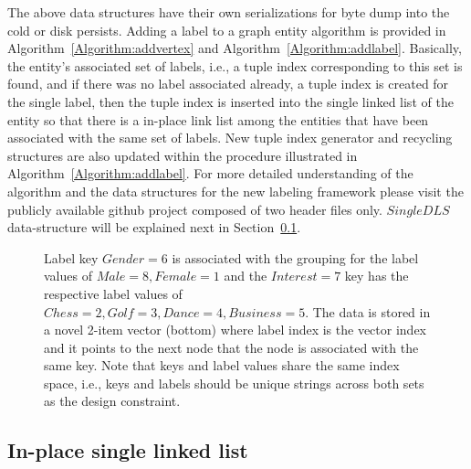 \documentclass[preprint,3p,twocolumn]{elsarticle}
\begin{document}
The above data structures have their own serializations for byte dump into the cold or disk persists. Adding a label to a graph entity algorithm is provided in Algorithm~\ref{Algorithm:addvertex} and Algorithm~\ref{Algorithm:addlabel}. Basically, the entity's associated set of labels, i.e., a tuple index corresponding to this set is found, and if there was no label associated already, a tuple index is created for the single label, then the tuple index is inserted into the single linked list of the entity so that there is a in-place link list among the entities that have been associated with the same set of labels. New tuple index generator and recycling structures are also updated within the procedure illustrated in Algorithm~\ref{Algorithm:addlabel}. For more detailed understanding of the algorithm and the data structures for the new labeling framework please visit the publicly available github project composed of two header files only. $SingleDLS$ data-structure will be explained next in Section~\ref{subsection:singlelist}.

\begin{figure}
\centering
    \caption{Label key $Gender=6$ is associated with the grouping for the label values of $Male=8,Female=1$ and the $Interest=7$ key has the respective label values of $Chess=2, Golf=3, Dance=4, Business=5$. The data is stored in a novel 2-item vector (bottom) where label index is the vector index and it points to the next node that the node is associated with the same key. Note that keys and label values share the same index space, i.e., keys and labels should be unique strings across both sets as the design constraint.}
    \label{Figure:labelset}
\end{figure} 
 
\subsection{\textbf{In-place single linked list}}
\label{subsection:singlelist}
\end{document}
